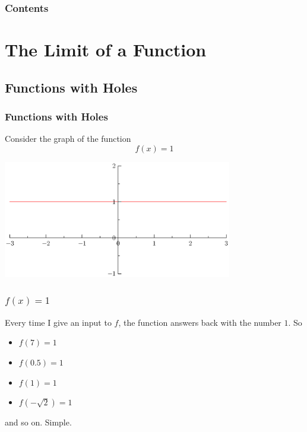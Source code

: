 \documentclass[serif,ignorenonframetext]{beamer}
\title{\commonTitleZeroOneFive}
\subtitle{\commonSubtitleZeroOneFive}
\author{\commonAuthor}
\institute{\commonInstitute}
\date{\commonDateZeroOneFive}
\begin{document}

\begin{frame}
  \titlepage
\end{frame}

\begin{frame}
  \frametitle{Contents}
  \tableofcontents
\end{frame}

\section{The Limit of a Function}

\subsection{Functions with Holes}

\begin{frame}
  \frametitle{Functions with Holes}
  Consider the graph of the function 
  \begin{displaymath}
    f(x)=1
  \end{displaymath}
  \begin{center}
    \includegraphics[width=0.75\textwidth]{graph1.eps}
  \end{center}
\end{frame}

\begin{frame}
  \frametitle{$f(x)=1$}
  Every time I give an input to $f$, the function answers back
  with the number $1$.  So
  \begin{itemize}
  \item $f(7)=1$
  \item $f(0.5)=1$
  \item $f(1)=1$
  \item $f(-\sqrt{2})=1$
  \end{itemize}
  and so on.  Simple.
\end{frame}
\end{document}
